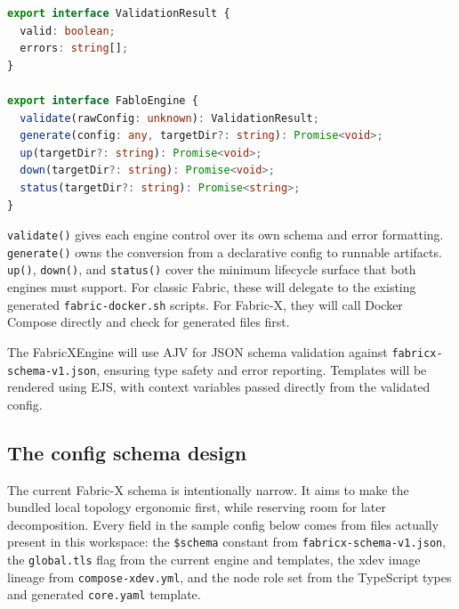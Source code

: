 \begin{tcolorbox}[colback=gray!5!white, colframe=gray!50!black,
  title=Engine contract (\texttt{src/engines/engine.ts}),
  fonttitle=\bfseries, arc=4pt]
\begin{lstlisting}[language=typescript, basicstyle=\ttfamily\small]
export interface ValidationResult {
  valid: boolean;
  errors: string[];
}

export interface FabloEngine {
  validate(rawConfig: unknown): ValidationResult;
  generate(config: any, targetDir?: string): Promise<void>;
  up(targetDir?: string): Promise<void>;
  down(targetDir?: string): Promise<void>;
  status(targetDir?: string): Promise<string>;
}
\end{lstlisting}
\end{tcolorbox}

\texttt{validate()} gives each engine control over its own schema and error formatting. \texttt{generate()} owns the conversion from a declarative config to runnable artifacts. \texttt{up()}, \texttt{down()}, and \texttt{status()} cover the minimum lifecycle surface that both engines must support. For classic Fabric, these will delegate to the existing generated \texttt{fabric-docker.sh} scripts. For Fabric-X, they will call Docker Compose directly and check for generated files first.

The FabricXEngine will use AJV for JSON schema validation against \texttt{fabricx-schema-v1.json}, ensuring type safety and error reporting. Templates will be rendered using EJS, with context variables passed directly from the validated config.

\subsection{The config schema design}

The current Fabric-X schema is intentionally narrow. It aims to make the bundled local topology ergonomic first, while reserving room for later decomposition. Every field in the sample config below comes from files actually present in this workspace: the \texttt{\$schema} constant from \texttt{fabricx-schema-v1.json}, the \texttt{global.tls} flag from the current engine and templates, the xdev image lineage from \texttt{compose-xdev.yml}, and the node role set from the TypeScript types and generated \texttt{core.yaml} template.

